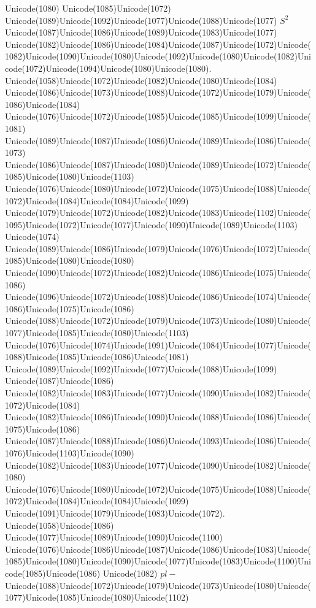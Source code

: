 \documentclass[a4paper,11pt]{report}
\begin{document}
{{Unicode(1080) Unicode(1085)Unicode(1072)
Unicode(1089)Unicode(1092)Unicode(1077)Unicode(1088)Unicode(1077) $S^2$ Unicode(1087)Unicode(1086)Unicode(1089)Unicode(1083)Unicode(1077)
Unicode(1082)Unicode(1086)Unicode(1084)Unicode(1087)Unicode(1072)Unicode(1082)Unicode(1090)Unicode(1080)Unicode(1092)Unicode(1080)Unicode(1082)Unicode(1072)Unicode(1094)Unicode(1080)Unicode(1080).
Unicode(1058)Unicode(1072)Unicode(1082)Unicode(1080)Unicode(1084)
Unicode(1086)Unicode(1073)Unicode(1088)Unicode(1072)Unicode(1079)Unicode(1086)Unicode(1084)
Unicode(1076)Unicode(1072)Unicode(1085)Unicode(1085)Unicode(1099)Unicode(1081)
Unicode(1089)Unicode(1087)Unicode(1086)Unicode(1089)Unicode(1086)Unicode(1073)
Unicode(1086)Unicode(1087)Unicode(1080)Unicode(1089)Unicode(1072)Unicode(1085)Unicode(1080)Unicode(1103)
Unicode(1076)Unicode(1080)Unicode(1072)Unicode(1075)Unicode(1088)Unicode(1072)Unicode(1084)Unicode(1084)Unicode(1099)
Unicode(1079)Unicode(1072)Unicode(1082)Unicode(1083)Unicode(1102)Unicode(1095)Unicode(1072)Unicode(1077)Unicode(1090)Unicode(1089)Unicode(1103)
Unicode(1074)
Unicode(1089)Unicode(1086)Unicode(1079)Unicode(1076)Unicode(1072)Unicode(1085)Unicode(1080)Unicode(1080)
Unicode(1090)Unicode(1072)Unicode(1082)Unicode(1086)Unicode(1075)Unicode(1086)
Unicode(1096)Unicode(1072)Unicode(1088)Unicode(1086)Unicode(1074)Unicode(1086)Unicode(1075)Unicode(1086)
Unicode(1088)Unicode(1072)Unicode(1079)Unicode(1073)Unicode(1080)Unicode(1077)Unicode(1085)Unicode(1080)Unicode(1103)
Unicode(1076)Unicode(1074)Unicode(1091)Unicode(1084)Unicode(1077)Unicode(1088)Unicode(1085)Unicode(1086)Unicode(1081)
Unicode(1089)Unicode(1092)Unicode(1077)Unicode(1088)Unicode(1099)
Unicode(1087)Unicode(1086)
Unicode(1082)Unicode(1083)Unicode(1077)Unicode(1090)Unicode(1082)Unicode(1072)Unicode(1084)
Unicode(1082)Unicode(1086)Unicode(1090)Unicode(1088)Unicode(1086)Unicode(1075)Unicode(1086)
Unicode(1087)Unicode(1088)Unicode(1086)Unicode(1093)Unicode(1086)Unicode(1076)Unicode(1103)Unicode(1090)
Unicode(1082)Unicode(1083)Unicode(1077)Unicode(1090)Unicode(1082)Unicode(1080)
Unicode(1076)Unicode(1080)Unicode(1072)Unicode(1075)Unicode(1088)Unicode(1072)Unicode(1084)Unicode(1084)Unicode(1099)
Unicode(1091)Unicode(1079)Unicode(1083)Unicode(1072).
Unicode(1058)Unicode(1086)
Unicode(1077)Unicode(1089)Unicode(1090)Unicode(1100)
Unicode(1076)Unicode(1086)Unicode(1087)Unicode(1086)Unicode(1083)Unicode(1085)Unicode(1080)Unicode(1090)Unicode(1077)Unicode(1083)Unicode(1100)Unicode(1085)Unicode(1086)
Unicode(1082) $pl-$Unicode(1088)Unicode(1072)Unicode(1079)Unicode(1073)Unicode(1080)Unicode(1077)Unicode(1085)Unicode(1080)Unicode(1102)
}}
\end{document}
